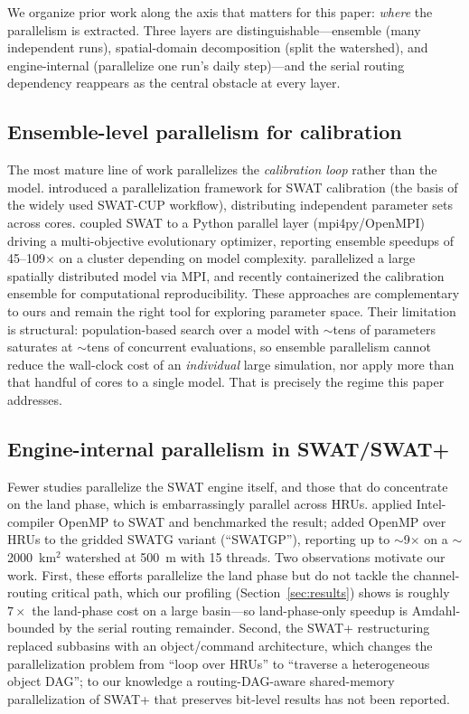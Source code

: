 We organize prior work along the axis that matters for this paper: \emph{where} the
parallelism is extracted. Three layers are distinguishable---ensemble (many independent
runs), spatial-domain decomposition (split the watershed), and engine-internal
(parallelize one run's daily step)---and the serial routing dependency reappears as the
central obstacle at every layer.

\subsection{Ensemble-level parallelism for calibration}
The most mature line of work parallelizes the \emph{calibration loop} rather than the model.
\citet{Rouholahnejad2012Parallelization} introduced a parallelization framework for SWAT
calibration (the basis of the widely used SWAT-CUP workflow), distributing independent
parameter sets across cores. \citet{Zhang2013Multiobjective} coupled SWAT to a Python
parallel layer (mpi4py/OpenMPI) driving a multi-objective evolutionary optimizer, reporting
ensemble speedups of 45--109$\times$ on a cluster depending on model complexity.
\citet{Yalew2013Grid} parallelized a large spatially distributed model via MPI, and
\citet{PASS4SWAT2024} recently containerized the calibration ensemble for computational
reproducibility. These approaches are complementary to ours and remain the right tool for
exploring parameter space. Their limitation is structural: population-based search over a
model with $\sim$tens of parameters saturates at $\sim$tens of concurrent evaluations, so
ensemble parallelism cannot reduce the wall-clock cost of an \emph{individual} large
simulation, nor apply more than that handful of cores to a single model. That is precisely
the regime this paper addresses.

\subsection{Engine-internal parallelism in SWAT/SWAT+}
Fewer studies parallelize the SWAT engine itself, and those that do concentrate on the land
phase, which is embarrassingly parallel across HRUs. \citet{Ki2015OpenMPSWAT} applied
Intel-compiler OpenMP to SWAT and benchmarked the result; \citet{Zhang2017SWATG} added OpenMP
over HRUs to the gridded SWATG variant (``SWATGP''), reporting up to $\sim$9$\times$ on a
$\sim$2000~km$^2$ watershed at 500~m with 15 threads. Two observations motivate our work.
First, these efforts parallelize the land phase but do not tackle the channel-routing
critical path, which our profiling (Section~\ref{sec:results}) shows is roughly $7\times$ the
land-phase cost on a large basin---so land-phase-only speedup is Amdahl-bounded by the
serial routing remainder. Second, the SWAT+ restructuring \citep{Bieger2017SWATPlus}
replaced subbasins with an object/command architecture, which changes the parallelization
problem from ``loop over HRUs'' to ``traverse a heterogeneous object DAG''; to our knowledge
a routing-DAG-aware shared-memory parallelization of SWAT+ that preserves bit-level results
has not been reported.


